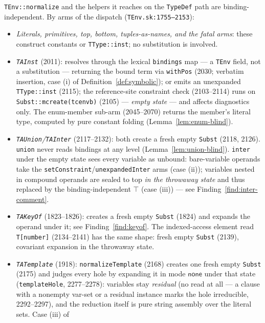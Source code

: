 \documentclass[11pt]{article}
\newcommand{\NoneM}{\mathsf{none}}
\begin{document}
\begin{lemma}
\label{lem:blind}
\texttt{TEnv::normalize} and the helpers it reaches on the
\texttt{TypeDef} path are binding-independent. By arms of the dispatch
(\texttt{TEnv.sk:1755--2153}):
\begin{itemize}
\item \emph{Literals, primitives, top, bottom, tuples-as-names, and the
  fatal arms}: these construct constants or \texttt{TType::inst}; no
  substitution is involved.
\item \emph{\texttt{TAInst}} (2011): resolves through the lexical
  \texttt{bindings} map — a \texttt{TEnv} field, not a substitution —
  returning the bound term via \texttt{withPos} (2030; verbatim
  insertion, case (i) of Definition~\ref{def:symbolic}); or emits an
  unexpanded \texttt{TType::inst} (2115); the reference-site constraint
  check (2103--2114) runs on \texttt{Subst::mcreate(tcenvb)} (2105) —
  \emph{empty state} — and affects diagnostics only. The
  enum-member sub-arm (2045--2070) returns the member's literal type,
  computed by pure constant folding (Lemma~\ref{lem:enum-blind}).
\item \emph{\texttt{TAUnion}/\texttt{TAInter}} (2117--2132): both create
  a fresh empty \texttt{Subst} (2118, 2126). \texttt{union} never reads
  bindings at any level (Lemma~\ref{lem:union-blind}). \texttt{inter}
  under the empty state sees every variable as unbound: bare-variable
  operands take the \texttt{setConstraint}/\texttt{unexpandedInter} arms
  (case (ii)); variables nested in compound operands are sealed to top
  \emph{in the throwaway state} and thus replaced by the
  binding-independent $\top$ (case (iii)) — see
  Finding~\ref{find:inter-comment}.
\item \emph{\texttt{TAKeyOf}} (1823--1826): creates a fresh empty
  \texttt{Subst} (1824) and expands the operand under it; see
  Finding~\ref{find:keyof}. The indexed-access element read
  \texttt{T[number]} (2134--2141) has the same shape: fresh empty
  \texttt{Subst} (2139), covariant expansion in the throwaway state.
\item \emph{\texttt{TATemplate}} (1918): \texttt{normalizeTemplate}
  (2168) creates one fresh empty \texttt{Subst} (2175) and judges every
  hole by expanding it in mode $\NoneM$ under that state
  (\texttt{templateHole}, 2277--2278): variables stay \emph{residual}
  (no read at all — a clause with a nonempty var-set or a residual
  instance marks the hole irreducible, 2292--2297), and the reduction
  itself is pure string assembly over the literal sets. Case (iii) of

\end{itemize}
\end{lemma}
\end{document}
